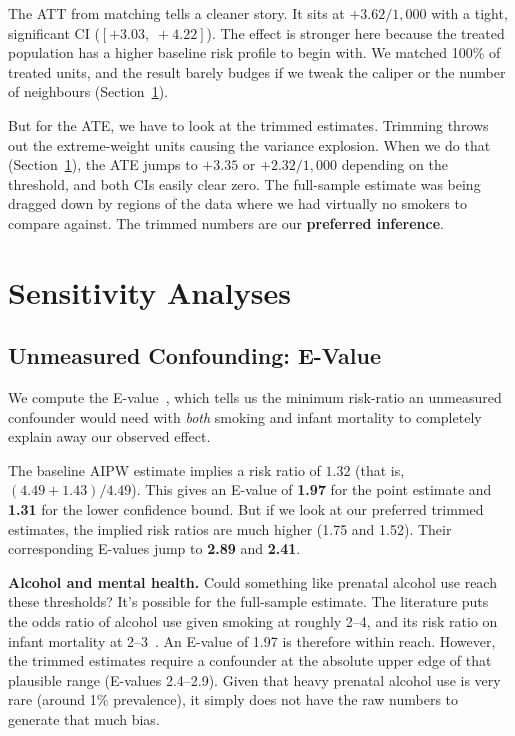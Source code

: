 \documentclass[11pt]{article}
\begin{document}
The ATT from matching tells a cleaner story. It sits at $+3.62/1{,}000$ with a tight,
significant CI ($[+3.03,\;+4.22]$). The effect is stronger here because the
treated population has a higher baseline risk profile to begin with. We matched
100\% of treated units, and the result barely budges if we tweak the caliper
or the number of neighbours (Section~\ref{sec:sensitivity}).

But for the ATE, we have to look at the trimmed estimates. Trimming throws out
the extreme-weight units causing the variance explosion. When we do that
(Section~\ref{sec:sensitivity}), the ATE jumps to $+3.35$ or $+2.32/1{,}000$
depending on the threshold, and both CIs easily clear zero. The full-sample
estimate was being dragged down by regions of the data where we had virtually
no smokers to compare against. The trimmed numbers are our \textbf{preferred
inference}.


\section{Sensitivity Analyses}
\label{sec:sensitivity}

\subsection{Unmeasured Confounding: E-Value}

We compute the E-value~\cite{vanderweele2017}, which tells us the
minimum risk-ratio an unmeasured confounder would need with \emph{both} smoking
and infant mortality to completely explain away our observed effect.

The baseline AIPW estimate implies a risk ratio of $1.32$ (that is,
$(4.49 + 1.43)/4.49$). This gives an E-value of \textbf{1.97} for the point
estimate and \textbf{1.31} for the lower confidence bound. But if we look at our
preferred trimmed estimates, the implied risk ratios are much higher (1.75 and 1.52).
Their corresponding E-values jump to \textbf{2.89} and \textbf{2.41}.

\textbf{Alcohol and mental health.} Could something like prenatal alcohol use
reach these thresholds? It's possible for the full-sample estimate. The literature
puts the odds ratio of alcohol use given smoking at roughly 2--4, and its risk
ratio on infant mortality at 2--3~\cite{cnattingius2004}. An E-value of 1.97 is
therefore within reach. However, the trimmed estimates require a confounder at the
absolute upper edge of that plausible range (E-values 2.4--2.9). Given that heavy
prenatal alcohol use is very rare (around 1\% prevalence), it simply does not
have the raw numbers to generate that much bias.
\end{document}
